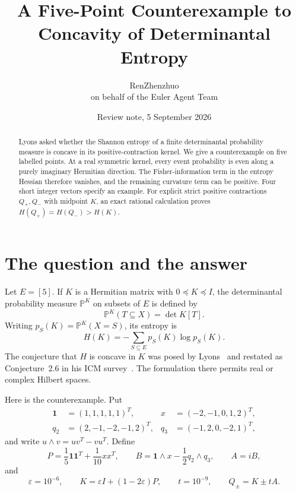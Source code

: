 \documentclass[11pt]{article}
\title{A Five-Point Counterexample to Concavity of Determinantal Entropy}
\author{RenZhenzhuo\\\small on behalf of the Euler Agent Team}
\date{Review note, 5 September 2026}
\newcommand{\PP}{\mathbb P}
\newcommand{\one}{\mathbf 1}
\begin{document}
\maketitle

\begin{abstract}
Lyons asked whether the Shannon entropy of a finite determinantal probability
measure is concave in its positive-contraction kernel.  We give a counterexample
on five labelled points.  At a real symmetric kernel, every event probability is
even along a purely imaginary Hermitian direction.  The Fisher-information term
in the entropy Hessian therefore vanishes, and the remaining curvature term can
be positive.  Four short integer vectors specify an example.  For explicit
strict positive contractions \(Q_+,Q_-\) with midpoint \(K\), an exact rational
calculation proves \(H(Q_+)=H(Q_-)>H(K)\).
\end{abstract}

\section{The question and the answer}

Let \(E=[5]\).  If \(K\) is a Hermitian matrix with \(0\preceq K\preceq I\),
the determinantal probability measure \(\PP^K\) on subsets of \(E\) is defined by
\[
 \PP^K(T\subseteq X)=\det K[T].
\]
Writing \(p_S(K)=\PP^K(X=S)\), its entropy is
\[
 H(K)=-\sum_{S\subseteq E}p_S(K)\log p_S(K).
\]
The conjecture that \(H\) is concave in \(K\) was posed by
Lyons~\cite{Lyons2003DPM} and restated as Conjecture~2.6 in his ICM
survey~\cite{Lyons2014}.  The formulation there permits real or complex Hilbert
spaces.

Here is the counterexample.  Put
\[
\begin{aligned}
 \one&=(1,1,1,1,1)^T,             &x&=(-2,-1,0,1,2)^T,\\
 q_2&=(2,-1,-2,-1,2)^T,           &q_3&=(-1,2,0,-2,1)^T,
\end{aligned}
\]
and write \(u\wedge v=uv^T-vu^T\).  Define
\begin{equation}\label{eq:construction}
 P=\frac15\one\one^T+\frac1{10}xx^T,
 \qquad
 B=\one\wedge x-\frac12q_2\wedge q_3,
 \qquad A=iB,
\end{equation}
and
\begin{equation}\label{eq:K}
 \varepsilon=10^{-6},\qquad K=\varepsilon I+(1-2\varepsilon)P,
 \qquad t=10^{-9},\qquad Q_\pm=K\pm tA.
\end{equation}
\end{document}
